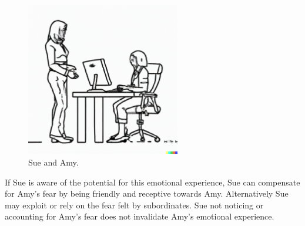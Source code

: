 \begin{figure}[H]
    \centering
\includegraphics[width=0.6\textwidth]{images/female supervisor standing while talking to seated female employee typing on keyboard.pdf}
    \caption{Sue and Amy.}
    \label{fig:subordinate_and_supervisor}
\end{figure}



If Sue is aware of the potential for this emotional experience, Sue can compensate for Amy's fear by being friendly and receptive towards Amy. Alternatively Sue may exploit or rely on the fear felt by subordinates. Sue not noticing or accounting for Amy's fear does not invalidate Amy's emotional experience.





